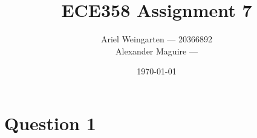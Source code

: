 \documentclass[a4paper]{article}
\title{ECE358 Assignment 7}
\author{Ariel Weingarten --- 20366892\\
        Alexander Maguire --- }
\date{\today}
\begin{document}
\maketitle

\section{Question 1}
\end{document}
